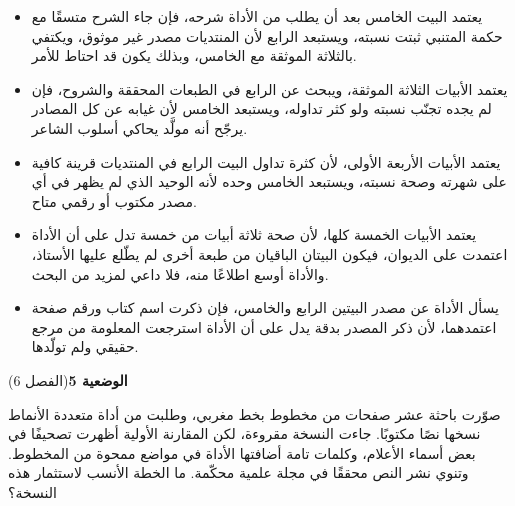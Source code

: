 \documentclass[11pt,a4paper]{article}
\begin{document}
\begin{itemize}[leftmargin=1.0cm, labelsep=6pt, itemsep=3pt, topsep=4pt, parsep=0pt]
  \item[\textbf{أ)}] يعتمد البيت الخامس بعد أن يطلب من الأداة شرحه، فإن جاء الشرح متسقًا مع حكمة المتنبي ثبتت نسبته، ويستبعد الرابع لأن المنتديات مصدر غير موثوق، ويكتفي بالثلاثة الموثقة مع الخامس، وبذلك يكون قد احتاط للأمر.
  \item[\textbf{ب)}] يعتمد الأبيات الثلاثة الموثقة، ويبحث عن الرابع في الطبعات المحققة والشروح، فإن لم يجده تجنّب نسبته ولو كثر تداوله، ويستبعد الخامس لأن غيابه عن كل المصادر يرجّح أنه مولَّد يحاكي أسلوب الشاعر.
  \item[\textbf{ج)}] يعتمد الأبيات الأربعة الأولى، لأن كثرة تداول البيت الرابع في المنتديات قرينة كافية على شهرته وصحة نسبته، ويستبعد الخامس وحده لأنه الوحيد الذي لم يظهر في أي مصدر مكتوب أو رقمي متاح.
  \item[\textbf{د)}] يعتمد الأبيات الخمسة كلها، لأن صحة ثلاثة أبيات من خمسة تدل على أن الأداة اعتمدت على الديوان، فيكون البيتان الباقيان من طبعة أخرى لم يطّلع عليها الأستاذ، والأداة أوسع اطلاعًا منه، فلا داعي لمزيد من البحث.
  \item[\textbf{هـ)}] يسأل الأداة عن مصدر البيتين الرابع والخامس، فإن ذكرت اسم كتاب ورقم صفحة اعتمدهما، لأن ذكر المصدر بدقة يدل على أن الأداة استرجعت المعلومة من مرجع حقيقي ولم تولّدها.
\end{itemize}
\par\vspace{6pt}
\noindent
{\large\khatt\textbf{الوضعية 5}}\hfill{\small(الفصل 6)}\par\nopagebreak\vspace{3pt}
\setlength{\fboxsep}{7pt}\colorbox{gray!10}{\parbox{\dimexpr\linewidth-14pt}{صوّرت باحثة عشر صفحات من مخطوط بخط مغربي، وطلبت من أداة متعددة الأنماط نسخها نصًا مكتوبًا. جاءت النسخة مقروءة، لكن المقارنة الأولية أظهرت تصحيفًا في بعض أسماء الأعلام، وكلمات تامة أضافتها الأداة في مواضع ممحوة من المخطوط. وتنوي نشر النص محققًا في مجلة علمية محكّمة. ما الخطة الأنسب لاستثمار هذه النسخة؟}}\par\nopagebreak
\end{document}
